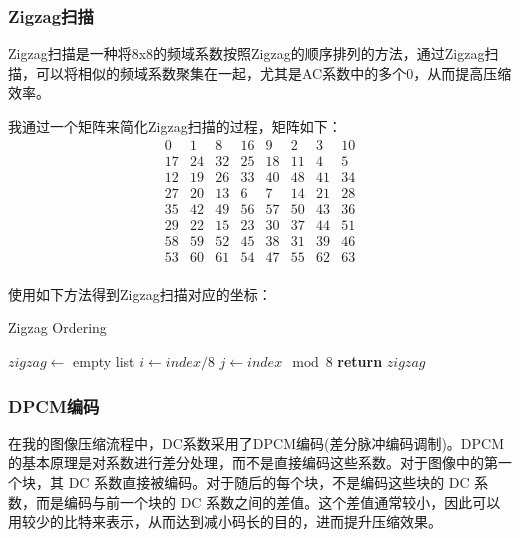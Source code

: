 \documentclass{article}
\begin{document}
\subsubsection{Zigzag扫描}

Zigzag扫描是一种将8x8的频域系数按照Zigzag的顺序排列的方法，通过Zigzag扫描，可以将相似的频域系数聚集在一起，尤其是AC系数中的多个0，从而提高压缩效率。

我通过一个矩阵来简化Zigzag扫描的过程，矩阵如下：
\[
\begin{matrix}
0 & 1 & 8 & 16 & 9 & 2 & 3 & 10 \\
17 & 24 & 32 & 25 & 18 & 11 & 4 & 5 \\
12 & 19 & 26 & 33 & 40 & 48 & 41 & 34 \\
27 & 20 & 13 & 6 & 7 & 14 & 21 & 28 \\
35 & 42 & 49 & 56 & 57 & 50 & 43 & 36 \\
29 & 22 & 15 & 23 & 30 & 37 & 44 & 51 \\
58 & 59 & 52 & 45 & 38 & 31 & 39 & 46 \\
53 & 60 & 61 & 54 & 47 & 55 & 62 & 63 \\
\end{matrix}
\]

使用如下方法得到Zigzag扫描对应的坐标：
\FloatBarrier
\begin{algorithm}
    \caption{Zigzag Ordering}
    \begin{algorithmic}[1]
    \State $zigzag \gets$ empty list
        \State $i \gets index / 8$  
        \State $j \gets index \mod 8$ 
        \State {}  
    \EndFor
    \State \textbf{return} $zigzag$
    \EndProcedure
    \end{algorithmic}
\end{algorithm}
\FloatBarrier

\subsubsection{DPCM编码}

在我的图像压缩流程中，DC系数采用了DPCM编码(差分脉冲编码调制)。DPCM 的基本原理是对系数进行差分处理，而不是直接编码这些系数。对于图像中的第一个块，其 DC 系数直接被编码。对于随后的每个块，不是编码这些块的 DC 系数，而是编码与前一个块的 DC 系数之间的差值。这个差值通常较小，因此可以用较少的比特来表示，从而达到减小码长的目的，进而提升压缩效果。
\end{document}
